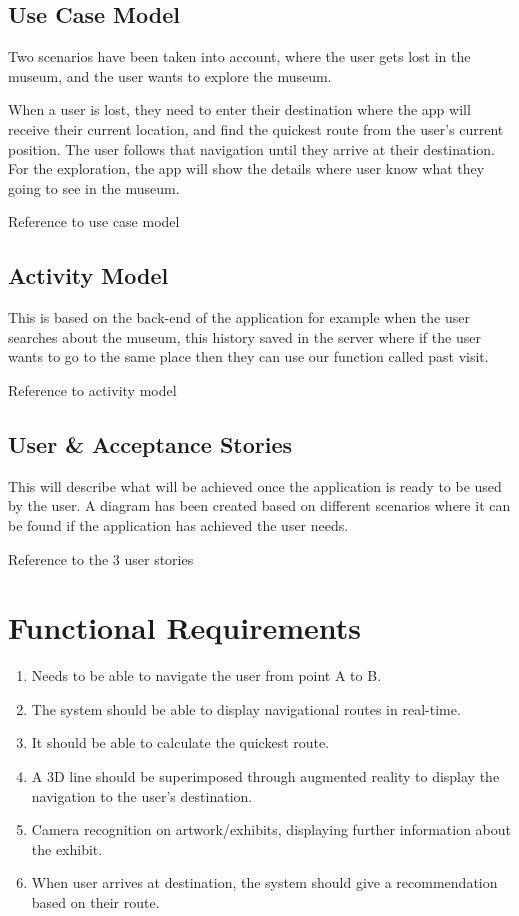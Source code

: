 \subsection*{Use Case Model}
Two scenarios have been taken into account, where the user gets lost in the museum, and the user wants to explore the museum. 

When a user is lost, they need to enter their destination where the app will receive their current location, and find the quickest route from the user's current position. The user follows that navigation until they arrive at their destination. For the exploration, the app will show the details where user know what they going to see in the museum.

Reference to use case model

\subsection*{Activity Model}
This is based on the back-end of the application for example when the user searches about the museum, this history saved in the server where if the user wants to go to the same place then they can use our function called past visit.

Reference to activity model

\subsection*{User \& Acceptance Stories}
This will describe what will be achieved once the application is ready to be used by the user. A diagram has been created based on different scenarios where it can be found if the application has achieved the user needs. 

Reference to the 3 user stories

\section*{Functional Requirements}
\begin{enumerate}
    \item Needs to be able to navigate the user from point A to B.
    \item The system should be able to display navigational routes in real-time.
    \item It should be able to calculate the quickest route.
    \item A 3D line should be superimposed through augmented reality to display the navigation to the user's destination.
    \item Camera recognition on artwork/exhibits, displaying further information about the exhibit.
    \item When user arrives at destination, the system should give a recommendation based on their route.
\end{enumerate}

